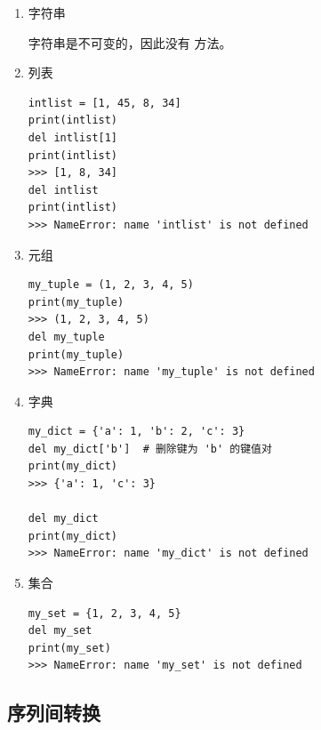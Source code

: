 \begin{enumerate}[label=\arabic*)]
    \item 字符串

    字符串是不可变的，因此没有  方法。

    \item 列表
\begin{lstlisting}[style=demostyle,numbers=none]
intlist = [1, 45, 8, 34]
print(intlist)
del intlist[1]
print(intlist)
>>> [1, 8, 34]
del intlist
print(intlist)
>>> NameError: name 'intlist' is not defined
\end{lstlisting}

    \item 元组

\begin{lstlisting}[style=demostyle,numbers=none]
my_tuple = (1, 2, 3, 4, 5)
print(my_tuple)
>>> (1, 2, 3, 4, 5)
del my_tuple
print(my_tuple)
>>> NameError: name 'my_tuple' is not defined
\end{lstlisting}

    \item 字典

\begin{lstlisting}[style=demostyle,numbers=none]
my_dict = {'a': 1, 'b': 2, 'c': 3}
del my_dict['b']  # 删除键为 'b' 的键值对
print(my_dict)
>>> {'a': 1, 'c': 3}

del my_dict
print(my_dict)
>>> NameError: name 'my_dict' is not defined
\end{lstlisting}

    \item 集合

\begin{lstlisting}[style=demostyle,numbers=none]
my_set = {1, 2, 3, 4, 5}
del my_set
print(my_set)
>>> NameError: name 'my_set' is not defined
\end{lstlisting}

\end{enumerate}



\subsection{序列间转换}
